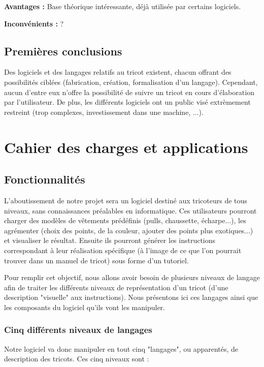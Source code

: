 \documentclass{article}
\begin{document}
\textbf{Avantages : } Base théorique intéressante, déjà utilisée par certains logiciels.

\textbf{Inconvénients : } ? %

\subsection{Premières conclusions}

Des logiciels et des langages relatifs au tricot existent, chacun offrant des possibilités ciblées (fabrication, création, formalisation 
d'un langage). Cependant, aucun d'entre eux n'offre la possibilité de suivre un tricot en cours d'élaboration par l'utilisateur. De plus, 
les différents logiciels ont un public visé extrèmement restreint (trop complexes, investissement dans une machine, ...).

\section{Cahier des charges et applications}

\subsection{Fonctionnalités}

L'aboutissement de notre projet sera un logiciel destiné aux tricoteurs de tous niveaux, sans connaissances préalables en informatique. 
Ces utilisateurs pourront charger des modèles de vêtements prédéfinis (pulls, chaussette, écharpe...), les agrémenter (choix des points, 
de la couleur, ajouter des points plus exotiques...) et visualiser le résultat. Ensuite ils pourront générer les instructions correspondant à leur réalisation 
spécifique (à l'image de ce que l'on pourrait trouver dans un manuel de tricot) sous forme d'un tutoriel.

Pour remplir cet objectif, nous allons avoir besoin de plusieurs niveaux de langage afin de traiter les différents niveaux de 
représentation d'un tricot (d'une description "visuelle" aux instructions). Nous présentons ici ces langages ainsi que les composants du 
logiciel qu'ils vont les manipuler.

\subsubsection{Cinq différents niveaux de langages}

Notre logiciel va donc manipuler en tout cinq "langages", ou apparentés, de description des tricots. Ces cinq niveaux sont :
\end{document}
